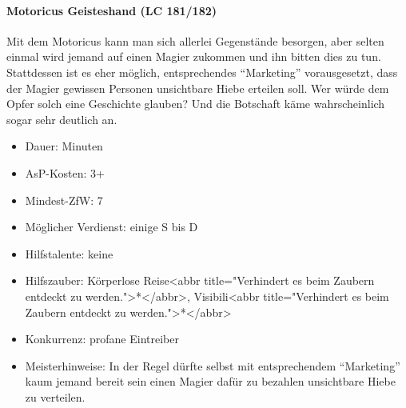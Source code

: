 \paragraph{Motoricus Geisteshand (LC 181/182)}
Mit dem Motoricus kann man sich allerlei Gegenstände besorgen, aber selten einmal wird jemand auf einen Magier zukommen und ihn bitten dies zu tun. Stattdessen ist es eher möglich, entsprechendes \enquote{Marketing} vorausgesetzt, dass der Magier gewissen Personen unsichtbare Hiebe erteilen soll. Wer würde dem Opfer solch eine Geschichte glauben? Und die Botschaft käme wahrscheinlich sogar sehr deutlich an.
\begin{itemize}
	\item Dauer: Minuten
	\item AsP-Kosten: 3+
	\item Mindest-ZfW: 7
	\item Möglicher Verdienst: einige S bis D
	\item Hilfstalente: keine
	\item Hilfszauber: Körperlose Reise<abbr title="Verhindert es beim Zaubern entdeckt zu werden.">*</abbr>, Visibili<abbr title="Verhindert es beim Zaubern entdeckt zu werden.">*</abbr>
	\item Konkurrenz: profane Eintreiber
	\item Meisterhinweise: In der Regel dürfte selbst mit entsprechendem \enquote{Marketing} kaum jemand bereit sein einen Magier dafür zu bezahlen unsichtbare Hiebe zu verteilen.
\end{itemize}


